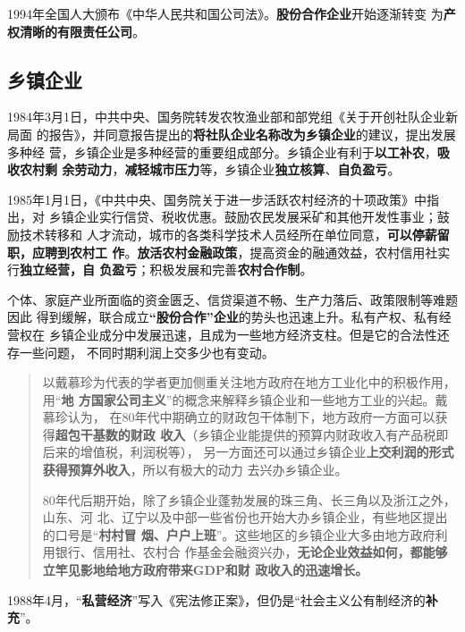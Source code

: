 1994年全国人大颁布《中华人民共和国公司法》。\textbf{股份合作企业}开始逐渐转变
为\textbf{产权清晰的有限责任公司}。

\subsection{乡镇企业}




1984年3月1日，中共中央、国务院转发农牧渔业部和部党组《关于开创社队企业新局面
的报告》，并同意报告提出的\textbf{将社队企业名称改为乡镇企业}的建议，提出发展多种经
营，乡镇企业是多种经营的重要组成部分。乡镇企业有利于\textbf{以工补农}，\textbf{吸收农村剩
  余劳动力}，\textbf{减轻城市压力}等，乡镇企业\textbf{独立核算}、\textbf{自负盈亏}。

1985年1月1日，《中共中央、国务院关于进一步活跃农村经济的十项政策》中指出，对
乡镇企业实行信贷、税收优惠。鼓励农民发展采矿和其他开发性事业；鼓励技术转移和
人才流动，城市的各类科学技术人员经所在单位同意，\textbf{可以停薪留职，应聘到农村工
  作}。\textbf{放活农村金融政策}，提高资金的融通效益，农村信用社实行\textbf{独立经营，自
  负盈亏}；积极发展和完善\textbf{农村合作制}。

个体、家庭产业所面临的资金匮乏、信贷渠道不畅、生产力落后、政策限制等难题因此
得到缓解，联合成立\textbf{“股份合作”企业}的势头也迅速上升。私有产权、私有经营权在
乡镇企业成分中发展迅速，且成为一些地方经济支柱。但是它的合法性还存一些问题，
不同时期利润上交多少也有变动。

\begin{quotation}
  以戴慕珍为代表的学者更加侧重关注地方政府在地方工业化中的积极作用，用“\textbf{地
    方国家公司主义}”的概念来解释乡镇企业和一些地方工业的兴起。戴慕珍认为，
  在80年代中期确立的财政包干体制下，地方政府一方面可以获得\textbf{超包干基数的财政
    收入}（乡镇企业能提供的预算内财政收入有产品税即后来的增值税，利润税等），
  另一方面还可以通过乡镇企业\textbf{上交利润的形式获得预算外收入}，所以有极大的动力
  去兴办乡镇企业。

  80年代后期开始，除了乡镇企业蓬勃发展的珠三角、长三角以及浙江之外，山东、河
  北、辽宁以及中部一些省份也开始大办乡镇企业，有些地区提出的口号是“\textbf{村村冒
    烟、户户上班}”。这些地区的乡镇企业大多由地方政府利用银行、信用社、农村合
  作基金会融资兴办，\textbf{无论企业效益如何，都能够立竿见影地给地方政府带来GDP和财
    政收入的迅速增长。}
\end{quotation}

1988年4月，“\textbf{私营经济}”写入《宪法修正案》，但仍是“社会主义公有制经济的\textbf{补
充}”。

